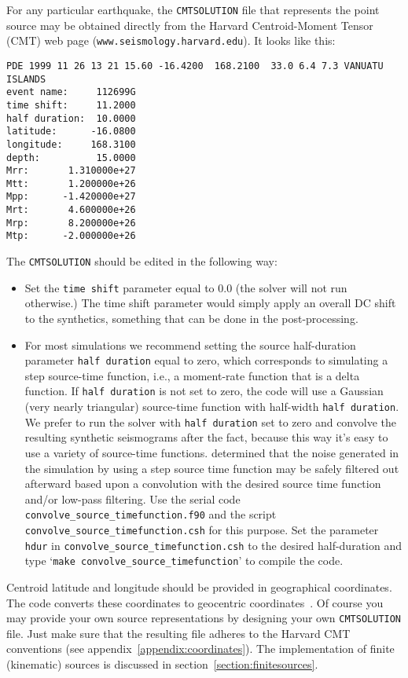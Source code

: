 \documentclass[onecolumn]{article}
\begin{document}
For any particular earthquake,
the \texttt{CMTSOLUTION} file that represents the point source may be
obtained directly from the Harvard Centroid-Moment Tensor
(CMT) web page  (\texttt{www.seismology.harvard.edu}).
It looks like this:
\begin{verbatim}
PDE 1999 11 26 13 21 15.60 -16.4200  168.2100  33.0 6.4 7.3 VANUATU ISLANDS
event name:     112699G
time shift:     11.2000
half duration:  10.0000
latitude:      -16.0800
longitude:     168.3100
depth:          15.0000
Mrr:       1.310000e+27
Mtt:       1.200000e+26
Mpp:      -1.420000e+27
Mrt:       4.600000e+26
Mrp:       8.200000e+26
Mtp:      -2.000000e+26
\end{verbatim}
The \texttt{CMTSOLUTION} should be edited in the following way:
\begin{itemize}
\item Set the \texttt{time shift} parameter equal to $0.0$
(the solver will not run otherwise.)
The time shift parameter would simply apply an overall DC shift to the
synthetics, something that can be done in the post-processing.
\item For most simulations we recommend setting the source
half-duration parameter \texttt{half duration} equal to zero,
which corresponds to simulating a step source-time function,
i.e., a moment-rate function that is a delta function.
If \texttt{half duration} is not set to zero,
the code will use a Gaussian (very nearly triangular)
source-time function with half-width \texttt{half duration}.
We prefer to run the solver with \texttt{half duration}
set to zero and convolve the resulting synthetic seismograms after the fact,
because this way it's easy to use a variety of source-time functions.
\cite{KoTr02a} determined that the noise generated in the simulation by
using a step source time function may be safely filtered out afterward
based upon a convolution with the desired source time function
and/or low-pass filtering.
Use the serial code \texttt{convolve\_source\_timefunction.f90} and the script
\texttt{convolve\_source\_timefunction.csh} for this purpose.
Set the parameter \texttt{hdur} in \texttt{convolve\_source\_timefunction.csh}
to the desired half-duration and
type `\texttt{make convolve\_source\_timefunction}' to compile the code.
\end{itemize}
Centroid latitude and longitude should be provided in geographical coordinates.
The code converts these coordinates to geocentric coordinates~\cite{DaTr98}.
Of course you may provide your own source representations by
designing your own \texttt{CMTSOLUTION} file.
Just make sure that the resulting file adheres to the Harvard CMT
conventions (see appendix~\ref{appendix:coordinates}).
The implementation of finite (kinematic) sources is discussed
in section~\ref{section:finitesources}.
\end{document}
